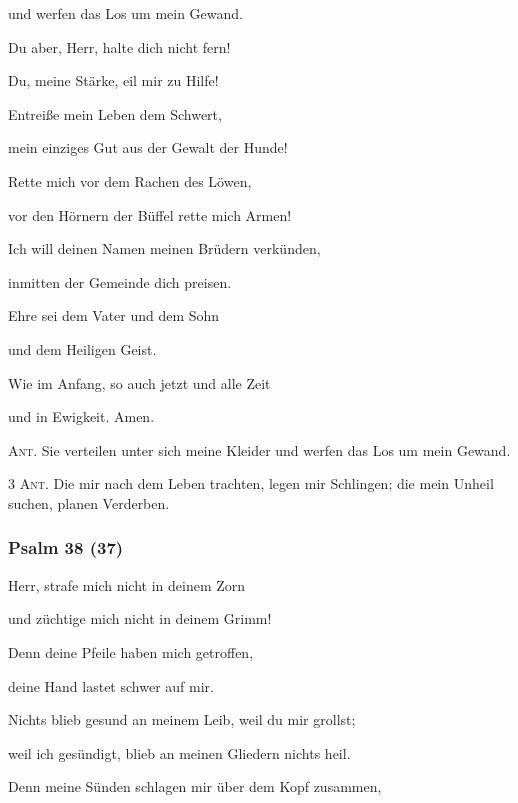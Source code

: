 und werfen das Los um mein Gewand.
 
\noindent Du aber, Herr, halte dich nicht fern!~\GreStar{}~\nopagebreak

Du, meine Stärke, eil mir zu Hilfe!
 
\noindent Entreiße mein Leben dem Schwert,~\GreStar{}~\nopagebreak

mein einziges Gut aus der Gewalt der Hunde!
 
\noindent Rette mich vor dem Rachen des Löwen,~\GreStar{}~\nopagebreak

vor den Hörnern der Büffel rette mich Armen!
 
\noindent Ich will deinen Namen meinen Brüdern verkünden,~\GreStar{}~\nopagebreak

inmitten der Gemeinde dich preisen.

\noindent Ehre sei dem Vater und dem Sohn~\GreStar{}~\nopagebreak

und dem Heiligen Geist.

\noindent Wie im Anfang, so auch jetzt und alle Zeit~\GreStar{}~\nopagebreak

und in Ewigkeit. Amen.

\vspace{10pt}

\noindent \textsc{Ant.} Sie verteilen unter sich meine Kleider und werfen das Los um mein Gewand.

\vspace{10pt}

\noindent \textsc{3 Ant.} Die mir nach dem Leben trachten, legen mir Schlingen; die mein Unheil suchen, planen Verderben.

\subsubsection{Psalm 38 (37)}

\noindent Herr, strafe mich nicht in deinem Zorn~\GreStar{}~\nopagebreak

und züchtige mich nicht in deinem Grimm!
 
\noindent Denn deine Pfeile haben mich getroffen,~\GreStar{}~\nopagebreak

deine Hand lastet schwer auf mir.
 
\noindent Nichts blieb gesund an meinem Leib, weil du mir grollst;~\GreStar{}~\nopagebreak

weil ich gesündigt, blieb an meinen Gliedern nichts heil.
 
\noindent Denn meine Sünden schlagen mir über dem Kopf zusammen,~\GreStar{}~\nopagebreak

